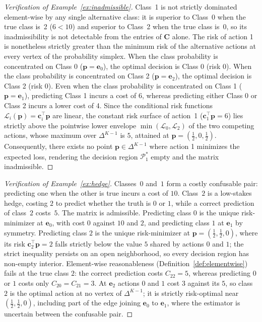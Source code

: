 \begin{proof}[Verification of Example~\ref{ex:inadmissible}]
Class~1 is not strictly dominated element-wise by any single alternative class: it is superior to Class~0 when the true class is~2 ($6 < 10$) and superior to Class~2 when the true class is~0, so its inadmissibility is not detectable from the entries of $\mathbf{C}$ alone. The risk of action 1 is nonetheless strictly greater than the minimum risk of the alternative actions at every vertex of the probability simplex. When the class probability is concentrated on Class 0 ($\mathbf{p} = \mathbf{e}_0$), the optimal decision is Class 0 (risk 0). When the class probability is concentrated on Class 2 ($\mathbf{p} = \mathbf{e}_2$), the optimal decision is Class 2 (risk 0). Even when the class probability is concentrated on Class 1 ($\mathbf{p} = \mathbf{e}_1$), predicting Class 1 incurs a cost of 6, whereas predicting either Class 0 or Class 2 incurs a lower cost of 4. Since the conditional risk functions $\mathcal{L}_i(\mathbf{p}) = \mathbf{c}_i^\top \mathbf{p}$ are linear, the constant risk surface of action~1 ($\mathbf{c}_1^\top \mathbf{p} = 6$) lies strictly above the pointwise lower envelope $\min(\mathcal{L}_0, \mathcal{L}_2)$ of the two competing actions, whose maximum over $\Delta^{K-1}$ is $5$, attained at $\mathbf{p} = (\tfrac{1}{2}, 0, \tfrac{1}{2})$. Consequently, there exists no point $\mathbf{p} \in \Delta^{K-1}$ where action 1 minimizes the expected loss, rendering the decision region $\mathcal{P}_1^*$ empty and the matrix inadmissible.
\end{proof}

\begin{proof}[Verification of Example~\ref{ex:hedge}]
Classes~$0$ and~$1$ form a costly confusable pair: predicting one when the other is true incurs a cost of $10$. Class~$2$ is a low-stakes hedge, costing $2$ to predict whether the truth is $0$ or $1$, while a correct prediction of class~$2$ costs~$5$. The matrix is admissible. Predicting class $0$ is the unique risk-minimizer at $\mathbf{e}_0$, with cost $0$ against $10$ and $2$, and predicting class $1$ at $\mathbf{e}_1$ by symmetry. Predicting class $2$ is the unique risk-minimizer at $\mathbf{p} = (\tfrac{1}{2}, \tfrac{1}{2}, 0)$, where its risk $\mathbf{c}_2^\top \mathbf{p} = 2$ falls strictly below the value $5$ shared by actions $0$ and $1$; the strict inequality persists on an open neighborhood, so every decision region has non-empty interior. Element-wise reasonableness (Definition~\ref{def:elementwise}) fails at the true class $2$: the correct prediction costs $C_{22} = 5$, whereas predicting $0$ or $1$ costs only $C_{20} = C_{21} = 3$. At $\mathbf{e}_2$ actions $0$ and $1$ cost $3$ against its $5$, so class $2$ is the optimal action at no vertex of $\Delta^{K-1}$; it is strictly risk-optimal near $(\tfrac{1}{2}, \tfrac{1}{2}, 0)$, including part of the edge joining $\mathbf{e}_0$ to $\mathbf{e}_1$, where the estimator is uncertain between the confusable pair.
\end{proof}

